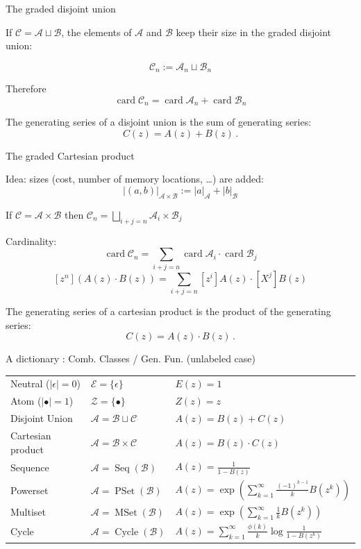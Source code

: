 \documentclass[compress,11pt]{beamer}
\def\opstyle#1{\ensuremath{\operatorname{#1}}}
\newcommand{\card}{\opstyle{card}}
\newcommand{\Seq}{\opstyle{Seq}}
\newcommand{\PSet}{\opstyle{PSet}}
\newcommand{\MSet}{\opstyle{MSet}}
\newcommand{\Cycle}{\opstyle{Cycle}}
\newcommand{\mA}{\mathcal{A}}
\newcommand{\mB}{\mathcal{B}}
\newcommand{\mC}{\mathcal{C}}
\newcommand{\mE}{\mathcal{E}}
\newcommand{\mZ}{\mathcal{Z}}
\begin{document}
\begin{frame}{The graded disjoint union}

  If $\mC = \mA \sqcup \mB$, the elements of $\mA$ and $\mB$ keep their
  size in the graded disjoint union:

  \[\mC_n := \mA_n \sqcup \mB_n\]

  Therefore
  \[\card\mC_n = \card\mA_n + \card\mB_n\]
  \bigskip\pause

  \begin{NOTE}
    The generating series of a disjoint union is the sum of generating
    series: \[C(z) = A(z) + B(z)\,.\]
  \end{NOTE}
\end{frame}

\begin{frame}{The graded Cartesian product}

  Idea: sizes (cost, number of memory locations,
  \dots) are added:
  \[|(a, b)|_{\mA\times\mB} := |a|_\mA + |b|_\mB\]

  If $\mC = \mA \times \mB$ then
  $\displaystyle\mC_n=\bigsqcup_{i+j=n} \mA_i \times \mB_j$
  \pause

  Cardinality:
  \[ \card\mC_n = \sum_{i+j=n} \card\mA_i \cdot \card\mB_j \]
  \[[z^n](A(z)\cdot B(z)) = \sum_{i+j=n} [z^i]A(z) \cdot [X^j]B(z)\]
  \begin{NOTE}
    The generating series of a cartesian product is the product of the
    generating series: \[C(z) = A(z) \cdot B(z)\,.\]
  \end{NOTE}
\end{frame}

\begin{frame}{A dictionary : Comb. Classes / Gen. Fun. (unlabeled case)}

  \small
  \begin{tabular}{lll}
    Neutral ($|\epsilon| = 0$)& $\mE=\{\epsilon\}$ & $E(z) = 1$\\
    Atom ($|\bullet| = 1$)& $\mZ = \{\bullet\}$ & $Z(z) = z$\\
    Disjoint Union & $\mA = \mB \sqcup \mC$ & $A(z) = B(z) + C(z)$\\
    Cartesian product & $\mA = \mB \times \mC$ & $A(z) = B(z) \cdot C(z)$\\
    Sequence & $\mA = \Seq(\mB)$ & $\displaystyle A(z) = \frac{1}{1- B(z)}$ \\
    Powerset & $\mA = \PSet(\mB)$ &
      $\displaystyle A(z) =
       \exp\left(\sum_{k=1}^{\infty} \frac{(-1)^{k-1}}{k}B(z^k)\right)$ \\
    Multiset & $\mA = \MSet(\mB)$ &
      $\displaystyle A(z) =
       \exp\left(\sum_{k=1}^{\infty} \frac{1}{k}B(z^k)\right)$ \\
    Cycle    & $\mA = \Cycle(\mB)$ &
      $\displaystyle A(z) =
       \sum_{k=1}^{\infty} \frac{\phi(k)}{k}\log\frac{1}{1-B(z^k)}$
  \end{tabular}
\end{frame}
\end{document}
